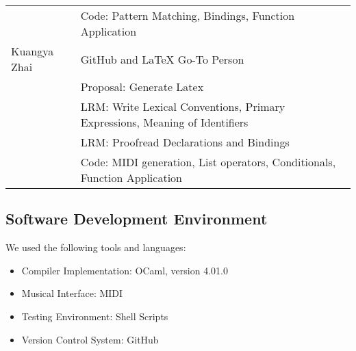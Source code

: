 \begin{table}[htdp]
\begin{tabular}{|l|l|}
										& Code: Pattern Matching, Bindings, Function Application \\
		Kuangya Zhai & GitHub and LaTeX Go-To Person \\ 
								& Proposal: Generate Latex \\
								& LRM: Write Lexical Conventions, Primary Expressions, Meaning of Identifiers \\
								& LRM:  Proofread Declarations and Bindings \\
								& Code: MIDI generation, List operators, Conditionals, Function Application \\
		\hline
		\end{tabular}
		\end{table} 
		
	\subsection{Software Development Environment}
		We used the following tools and languages:
		\begin{itemize}
		\item Compiler Implementation: OCaml, version 4.01.0
		\item Musical Interface: MIDI
		\item Testing Environment: Shell Scripts
		\item Version Control System: GitHub
		\end{itemize}
	
